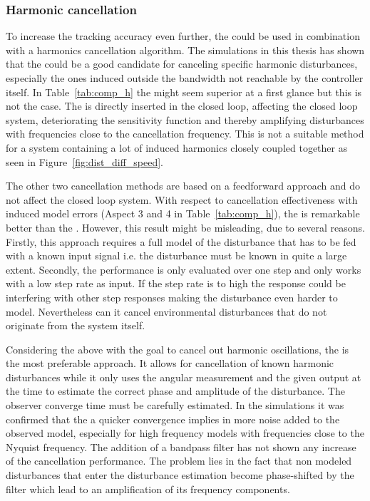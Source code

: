 \subsubsection{Harmonic cancellation}
To increase the tracking accuracy even further, the \abbrIRC could be used in combination with a harmonics cancellation algorithm. The simulations in this thesis has shown that the \abbrRFDC could be a good candidate for canceling specific harmonic disturbances, especially the ones induced outside the bandwidth not reachable by the controller itself. In Table~\ref{tab:comp_h} the \abbrIMP might seem superior at a first glance but this is not the case. The \abbrIMP is directly inserted in the closed loop, affecting the closed loop system, deteriorating the sensitivity function and thereby amplifying disturbances with frequencies close to the cancellation frequency. This is not a suitable method for a system containing a lot of induced harmonics closely coupled together as seen in Figure~\ref{fig:dist_diff_speed}.

The other two cancellation methods are based on a feedforward approach and do not affect the closed loop system. With respect to cancellation effectiveness with induced model errors (Aspect 3 and 4 in Table~\ref{tab:comp_h}), the \abbrFDC is remarkable better than the \abbrRFDC. However, this result might be misleading, due to several reasons. Firstly, this approach requires a full model of the disturbance that has to be fed with a known input signal i.e. the disturbance must be known in quite a large extent. Secondly, the \abbrFDC performance is only evaluated over one step and only works with a low step rate as input. If the step rate is to high the response could be interfering with other step responses making the disturbance even harder to model. Nevertheless can it cancel environmental disturbances that do not originate from the system itself.

Considering the above with the goal to cancel out harmonic oscillations, the \abbrRFDC is the most preferable approach. It allows for cancellation of known harmonic disturbances while it only uses the angular measurement and the given output at the time to estimate the correct phase and amplitude of the disturbance. The observer converge time must be carefully estimated. In the simulations it was confirmed that the a quicker convergence implies in more noise added to the observed model, especially for high frequency models with frequencies close to the Nyquist frequency. The addition of a bandpass filter has not shown any increase of the cancellation performance. The problem lies in the fact that non modeled disturbances that enter the disturbance estimation become phase-shifted by the filter which lead to an amplification of its frequency components.

